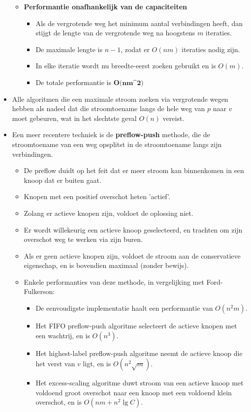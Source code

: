 \begin{itemize}
\begin{itemize}
        \item \textbf{Performantie onafhankelijk van de capaciteiten}
        \begin{itemize}
            \item Als de vergrotende weg het minimum aantal verbindingen heeft, dan stijgt de lengte van de vergrotende weg na hoogstens $m$ iteraties.
            \item De maximale lengte is $n-1$, zodat er $O(nm)$ iteraties nodig zijn.
            \item In elke iteratie wordt nu breedte-eerst zoeken gebruikt en is $O(m)$.
            \item De totale performantie is $\textbf{O(nm^2)}$
        \end{itemize}
    \end{itemize}
    \item Alle algoritmen die een maximale stroom zoeken via vergrotende wegen hebben als nadeel dat die stroomtoename langs de hele weg van $p$ naar $v$ moet gebeuren, wat in het slechtste geval $O(n)$ vereist.
    \item Een meer recentere techniek is de \textbf{preflow-push} methode, die de stroomtoename van een weg opsplitst in de stroomtoename langs zijn verbindingen.
    \begin{itemize}
        \item De preflow duidt op het feit dat er meer stroom kan binnenkomen in een knoop dat er buiten gaat.
        \item Knopen met een positief overschot heten 'actief'.
        \item Zolang er actieve knopen zijn, voldoet de oplossing niet.
        \item Er wordt willekeurig een actieve knoop geselecteerd, en trachten om zijn overschot weg te werken via zijn buren.
        \item Als er geen actieve knopen zijn, voldoet de stroom aan de conservatieve eigenschap, en is bovendien maximaal (zonder bewijs).
        \item Enkele performanties van deze methode, in vergelijking met Ford-Fulkerson:
        \begin{itemize}
            \item De eenvoudigste implementatie haalt een performantie van $O(n^2m)$.
            \item Het FIFO preflow-push algoritme selecteert de actieve knopen met een wachtrij, en is $O(n^3)$.
            \item Het highest-label preflow-push algoritme neemt de actieve knoop die het verst van $v$ ligt, en is $O(n^2\sqrt{m})$.
            \item Het excess-scaling algoritme duwt stroom van een actieve knoop met voldoend groot overschot naar een knoop met een voldoend klein overschot, en is $O(nm + n^2 \lg C)$.
        \end{itemize}
    \end{itemize}
\end{itemize}

